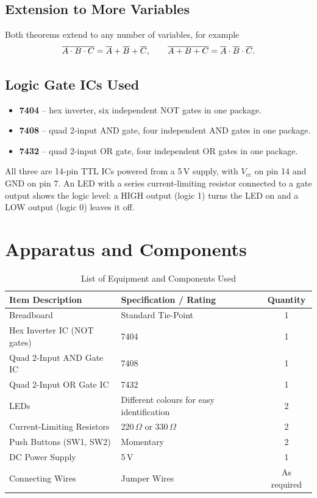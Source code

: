 \subsection{Extension to More Variables}
Both theorems extend to any number of variables, for example
\[
\overline{A\cdot B\cdot C}=\overline{A}+\overline{B}+\overline{C},\qquad \overline{A+B+C}=\overline{A}\cdot\overline{B}\cdot\overline{C}.
\]

\subsection{Logic Gate ICs Used}
\begin{itemize}
	\item \textbf{7404} -- hex inverter, six independent NOT gates in one package.
	\item \textbf{7408} -- quad 2-input AND gate, four independent AND gates in one package.
	\item \textbf{7432} -- quad 2-input OR gate, four independent OR gates in one package.
\end{itemize}
All three are 14-pin TTL ICs powered from a 5\,V supply, with $V_{cc}$ on pin 14 and GND on pin 7. An LED with a series current-limiting resistor connected to a gate output shows the logic level: a HIGH output (logic 1) turns the LED on and a LOW output (logic 0) leaves it off.

\section{Apparatus and Components}
\begin{table}[H]
	\centering
	\caption{List of Equipment and Components Used}\label{tab:apparatus10}
	\small
	\begin{tabular}{@{}llc@{}}
		\toprule
		Item Description & Specification / Rating & Quantity \\
		\midrule
		Breadboard & Standard Tie-Point & 1 \\
		Hex Inverter IC (NOT gates) & 7404 & 1 \\
		Quad 2-Input AND Gate IC & 7408 & 1 \\
		Quad 2-Input OR Gate IC & 7432 & 1 \\
		LEDs & Different colours for easy identification & 2 \\
		Current-Limiting Resistors & 220\,$\Omega$ or 330\,$\Omega$ & 2 \\
		Push Buttons (SW1, SW2) & Momentary & 2 \\
		DC Power Supply & 5\,V & 1 \\
		Connecting Wires & Jumper Wires & As required \\
		\bottomrule
	\end{tabular}
\end{table}

